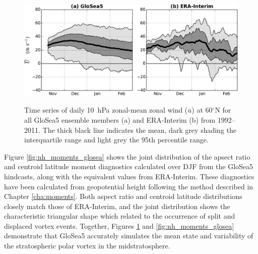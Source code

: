 \begin{figure}[t]
  \noindent\includegraphics[width=\textwidth,angle=0]{figures/chapter-seasonal/zmzw_climatologies_nh.pdf}\\
  \caption[NH comparison of GloSea5 and ERA-Interim zonal-mean zonal wind
  climatologies.]{Time series of daily 10~hPa zonal-mean zonal wind
    ($\overline{u}$) at 60$^{\circ}$N for all GloSea5 ensemble members (a) and
    ERA-Interim (b) from 1992--2011. The thick black line indicates the mean,
    dark grey shading the interquartile range and light grey the 95th percentile
    range.}\label{fig:nh_zmzw_clim}
\end{figure}

Figure \ref{fig:nh_moments_glosea} shows the joint distribution of the apsect
ratio and centroid latitude moment diagnostics calculated over DJF from the
GloSea5 hindcasts, along with the equivalent values from ERA-Interim. These
diagnostics have been calculated from geopotential height following the method
described in Chapter \ref{cha:moments}. Both aspect ratio and centroid latitude
distributions closely match those of ERA-Interim, and the joint distribution
shows the characteristic triangular shape which related to the occurrence of
split and displaced vortex events. Together, Figures \ref{fig:nh_zmzw_clim} and
\ref{fig:nh_moments_glosea} demonstrate that GloSea5 accurately simulates the
mean state and variability of the stratospheric polar vortex in the
midstratosphere.  

